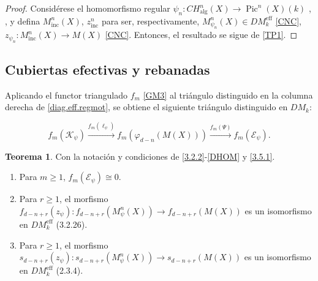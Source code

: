 \documentclass[10pt]{amsart}
\theoremstyle{definition}
\newtheorem{theorem}[definition]{Teorema}
\theoremstyle{remark}
\theoremstyle{definition}
\begin{document}
\begin{proof}
Considérese el homomorfismo regular $\psi_{n}:CH^{n}_{\mathrm{alg}}(X)\to \operatorname{Pic}^{n}(X)(k)$ \cite[p. 446-447]{Kle71}, \cite[Thm. 3.6]{Sai79}, y defina $M^{n}_{\mathrm{inc}}(X)$, $z^{n}_{\mathrm{inc}}$ para ser, respectivamente, $M^{n}_{\psi_{n}}(X)\in DM^{\mathrm{eff}}_{k}$ \ref{CNC}, $z_{\psi_{n}}:M^{n}_{\mathrm{inc}}(X)\to M(X)$ \ref{CNC}. Entonces, el resultado se sigue de \ref{TP1}.
\end{proof}

\subsection{Cubiertas efectivas y rebanadas}

Aplicando el functor triangulado $f_{m}$ \ref{GM3} al triángulo distinguido en la columna derecha de \ref{diag.eff.regmot}, se obtiene el siguiente triángulo distinguido en $DM_{k}$:

\begin{equation}\label{3.5.1}
f_{m}(\mathcal{K}_{\psi})\xrightarrow{f_{m}(\ell_{\psi})}f_{m}(\varphi_{d-n}(M(X)))\xrightarrow{f_{m}(\Psi)}f_{m}(\mathcal{E}_{\psi}).
\end{equation}


\begin{theorem}\label{TP2}
Con la notación y condiciones de \ref{3.2.2}-\ref{DHOM} y \ref{3.5.1}.

\begin{enumerate}
\item\label{TP21} Para $m\geq 1$, $f_{m}(\mathcal{E}_{\psi})\cong 0$.

\item\label{TP22} Para $r\geq 1$, el morfismo $f_{d-n+r}(z_{\psi}):f_{d-n+r}(M^{n}_{\psi}(X))\to f_{d-n+r}(M(X))$ es un isomorfismo en $DM^{\mathrm{eff}}_{k}$ (3.2.26).

\item\label{TP23} Para $r\geq 1$, el morfismo $s_{d-n+r}(z_{\psi}):s_{d-n+r}(M^{n}_{\psi}(X))\to s_{d-n+r}(M(X))$ es un isomorfismo en $DM^{\mathrm{eff}}_{k}$ (2.3.4).
\end{enumerate}
\end{theorem}
\end{document}
